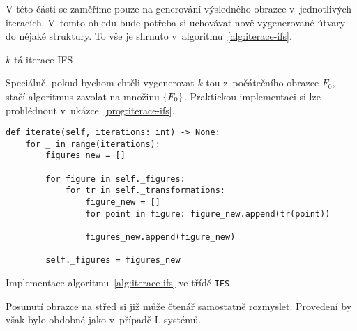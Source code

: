 V této části se zaměříme pouze na generování výsledného obrazce v~jednotlivých iteracích. V~tomto ohledu bude potřeba si uchovávat nově vygenerované útvary do nějaké struktury. To vše je shrnuto v~algoritmu~\ref{alg:iterace-ifs}.
\begin{algorithm}[h]
    \;
    \caption{$k$-tá iterace IFS}
    \label{alg:iterace-ifs}
\end{algorithm}
Speciálně, pokud bychom chtěli vygenerovat $k$-tou z~počátečního obrazce $F_0$, stačí algoritmus zavolat na množinu $\left\{F_0\right\}$. Praktickou implementaci si lze prohlédnout v~ukázce~\ref{prog:iterace-ifs}.
\begin{program}[h]
\begin{lstlisting}[style=python]
def iterate(self, iterations: int) -> None:
    for _ in range(iterations):
        figures_new = []
        
        for figure in self._figures:
            for tr in self._transformations:
                figure_new = []
                for point in figure: figure_new.append(tr(point))

                figures_new.append(figure_new)
    
        self._figures = figures_new
\end{lstlisting}
    \caption{Implementace algoritmu~\ref{alg:iterace-ifs} ve třídě \texttt{IFS}}
    \label{prog:iterace-ifs}
\end{program}
Posunutí obrazce na střed si již může čtenář samostatně rozmyslet. Provedení by však bylo obdobné jako v~případě L-systémů.